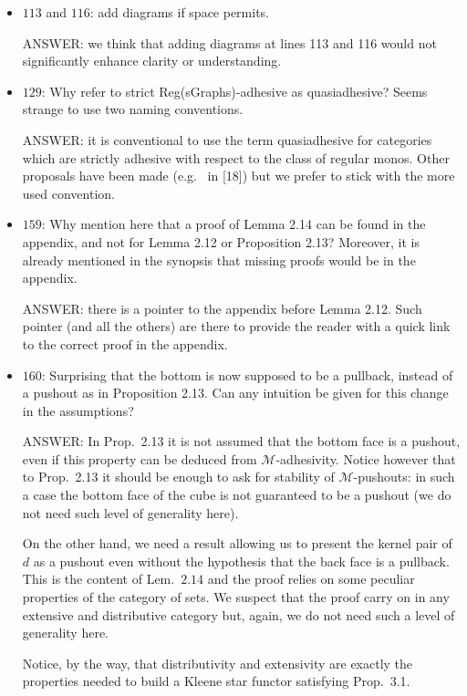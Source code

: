 \documentclass[english,11pt,a4paper]{article}
\begin{document}
\begin{itemize}
\item $113$ and $116$: add diagrams if space permits.

ANSWER: we think that adding diagrams at lines 113 and 116 would not  significantly enhance clarity or understanding.

\item $129$: Why refer to strict Reg(sGraphs)-adhesive as quasiadhesive? Seems strange to use two naming conventions.

ANSWER: it is conventional to use the term quasiadhesive for categories which are strictly adhesive with respect to the class of regular monos. Other proposals have been made (e.g.~ in [18]) but we prefer to stick with the more used convention.

\item $159$: Why mention here that a proof of Lemma 2.14 can be found in the appendix, and not for Lemma 2.12 or Proposition 2.13? Moreover, it is already mentioned in the synopsis that missing proofs would be in the appendix.

ANSWER: there is a pointer to the appendix before Lemma 2.12. Such pointer (and all the others) are there to provide the reader with a quick link to the correct proof in the appendix.

\item $160$: Surprising that the bottom is now supposed to be a pullback, instead of a pushout as in Proposition 2.13. Can any intuition be given for this change in the assumptions?

ANSWER: In Prop.~2.13 it is not assumed that the bottom face is a pushout, even if this property can be deduced from $\mathcal{M}$-adhesivity. Notice however that to Prop.~2.13 it should be enough to ask for stability of $\mathcal{M}$-pushouts: in such a case the bottom face of the cube is not guaranteed to be a pushout (we do not need such level of generality here). 

On the other hand, we need a result allowing us to present the kernel pair of $d$ as a pushout even without the hypothesis that the back face is a pullback. This is the content of Lem.~$2.14$ and the proof relies on some peculiar properties of the category of sets. We suspect that the proof carry on in any extensive and distributive category but, again, we do not need such a level of generality here.

Notice, by the way, that distributivity and extensivity are exactly the properties needed to build a Kleene star functor satisfying Prop.~3.1.


\end{itemize}
\end{document}
